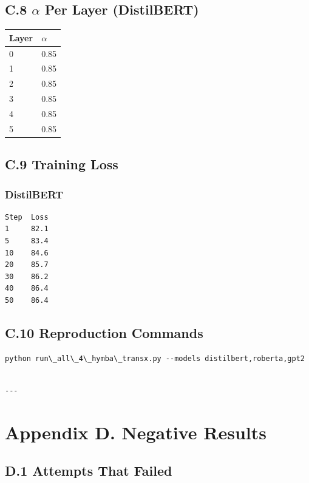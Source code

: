 \subsection{C.8 $\alpha$ Per Layer (DistilBERT)}

\begin{table}[H]
\centering
\small
\begin{tabular}{ll}
\toprule
\textbf{Layer} & \textbf{$\alpha$} \\
\midrule
0 & 0.85 \\
1 & 0.85 \\
2 & 0.85 \\
3 & 0.85 \\
4 & 0.85 \\
5 & 0.85 \\
\bottomrule
\end{tabular}
\end{table}

\subsection{C.9 Training Loss}

\subsubsection{DistilBERT}
\begin{lstlisting}
Step  Loss
1     82.1
5     83.4
10    84.6
20    85.7
30    86.2
40    86.4
50    86.4
\end{lstlisting}

\subsection{C.10 Reproduction Commands}

\begin{lstlisting}
python run\_all\_4\_hymba\_transx.py --models distilbert,roberta,gpt2
\end{lstlisting}
\begin{lstlisting}

---
\end{lstlisting}

\section{Appendix D. Negative Results}

\subsection{D.1 Attempts That Failed}

